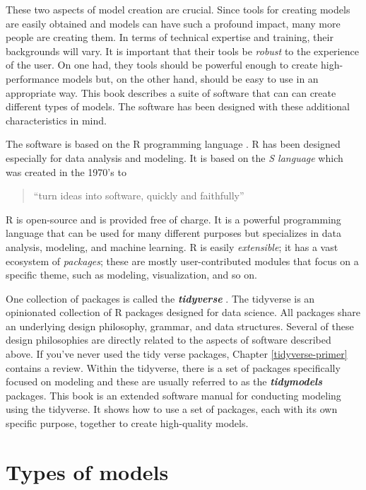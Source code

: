 \documentclass[11pt]{book}
\begin{document}
These two aspects of model creation are crucial. Since tools for creating models are easily obtained and models can have such a profound impact, many more people are creating them. In terms of technical expertise and training, their backgrounds will vary. It is important that their tools be \emph{robust} to the experience of the user. On one had, they tools should be powerful enough to create high-performance models but, on the other hand, should be easy to use in an appropriate way. This book describes a suite of software that can can create different types of models. The software has been designed with these additional characteristics in mind.

The software is based on the R programming language \citep{baseR}. R has been designed especially for data analysis and modeling. It is based on the \emph{S language} which was created in the 1970's to

\begin{quote}
``turn ideas into software, quickly and faithfully'' \citep{Chambers:1998}
\end{quote}

R is open-source and is provided free of charge. It is a powerful programming language that can be used for many different purposes but specializes in data analysis, modeling, and machine learning. R is easily \emph{extensible}; it has a vast ecosystem of \emph{packages}; these are mostly user-contributed modules that focus on a specific theme, such as modeling, visualization, and so on.

One collection of packages is called the \textbf{\emph{tidyverse}} \citep{tidyverse}. The tidyverse is an opinionated collection of R packages designed for data science. All packages share an underlying design philosophy, grammar, and data structures. Several of these design philosophies are directly related to the aspects of software described above. If you've never used the tidy verse packages, Chapter \ref{tidyverse-primer} contains a review. Within the tidyverse, there is a set of packages specifically focused on modeling and these are usually referred to as the \textbf{\emph{tidymodels}} packages. This book is an extended software manual for conducting modeling using the tidyverse. It shows how to use a set of packages, each with its own specific purpose, together to create high-quality models.

\hypertarget{types-of-models}{%
\section{Types of models}\label{types-of-models}}
\end{document}
